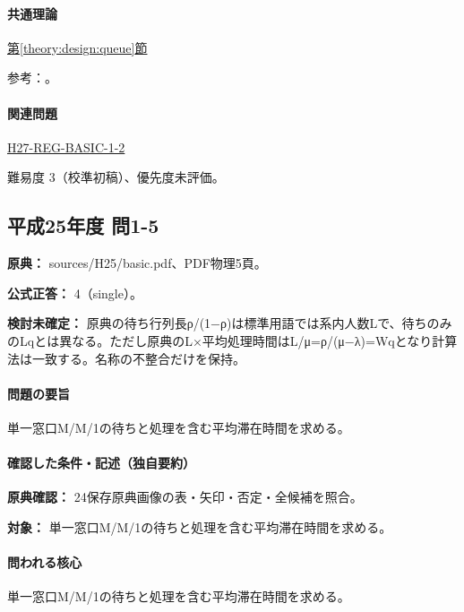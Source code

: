 \paragraph{共通理論} \hyperref[theory:design:queue]{第\ref*{theory:design:queue}節}

\par 参考：\cite{design48_queue_ref}。

\paragraph{関連問題} \hyperref[q:h27-reg-basic-1-2]{H27-REG-BASIC-1-2}

\par 難易度 3（校準初稿）、優先度未評価。

\subsection{平成25年度 問1-5}
\label{q:h25-reg-basic-1-5}

\noindent\textbf{原典：} sources/H25/basic.pdf、PDF物理5頁。

\textbf{公式正答：} 4（single）。

\par\textbf{検討未確定：} 原典の待ち行列長ρ/(1−ρ)は標準用語では系内人数Lで、待ちのみのLqとは異なる。ただし原典のL×平均処理時間はL/μ=ρ/(μ−λ)=\allowbreak{}Wqとなり計算法は一致する。名称の不整合だけを保持。

\paragraph{問題の要旨} 単一窓口M/M/1の待ちと処理を含む平均滞在時間を求める。

\paragraph{確認した条件・記述（独自要約）}\mbox{}\par

\noindent\textbf{原典確認：} 24保存原典画像の表・矢印・否定・全候補を照合。\par

\noindent\textbf{対象：} 単一窓口M/M/1の待ちと処理を含む平均滞在時間を求める。\par

\paragraph{問われる核心} 単一窓口M/M/1の待ちと処理を含む平均滞在時間を求める。

